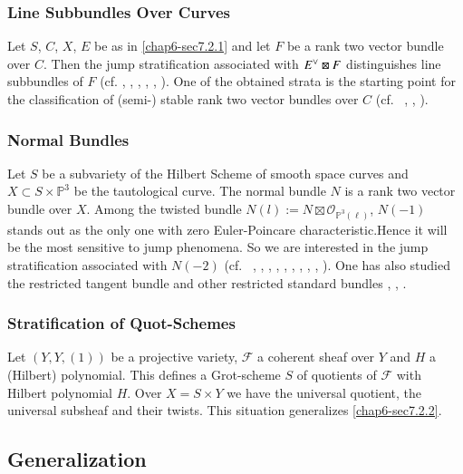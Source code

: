 \subsubsection{Line Subbundles Over Curves}\label{chap6-sec7.2.4}

Let $S$, $C$, $X$, $E$ be as in \ref{chap6-sec7.2.1} and let $F$ be a
rank two vector bundle over $C$. Then the jump stratification
associated with $E\spcheck \boxtimes F$ distinguishes line subbundles
of $F$
(cf. \cite{chap6-N}, \cite{chap6-Ma1}, \cite{chap6-St}, \cite{chap6-Gu},
\cite{chap6-LN}, \cite{chap6-Ray}). One of the obtained strata is the
starting point for the classification of (semi-) stable rank two
vector bundles over $C$
(cf.~ \cite{chap6-NR1}, \cite{chap6-NR2}, \cite{chap6-NR3}). 

\subsubsection{Normal Bundles}\label{chap6-sec7.2.5}

Let $S$ be a subvariety of the Hilbert Scheme of smooth space curves
and $X\subset S\times \mathbb{P}^{3}$ be the tautological curve. The
normal bundle $N$ is a rank two vector bundle over $X$. Among the
twisted bundle $N(l):=N\boxtimes \mathscr{O}_{\mathbb{P}^{3}(\ell)}$,
$N(-1)$ stands out as the only one with zero Euler-Poincare
characteristic.\pageoriginale Hence it will be the most sensitive to
jump phenomena. So we are interested in the jump stratification
associated with $N(-2)$
(cf.~ \cite{chap6-GS}, \cite{chap6-S1}, \cite{chap6-EV1}, \cite{chap6-EV2},
\cite{chap6-EL}, \cite{chap6-HuS}, \cite{chap6-El}, \cite{chap6-BE2}, \cite{chap6-E1H},
\cite{chap6-Hu2}). One has also studied the restricted tangent bundle
and other restricted standard
bundles \cite{chap6-V}, \cite{chap6-Br}, \cite{chap6-Ki}.

\subsubsection{Stratification of Quot-Schemes}\label{chap6-sec7.2.6}

Let $(Y,Y,(1))$ be a projective variety, $\mathscr{F}$ a coherent
sheaf over $Y$ and $H$ a (Hilbert) polynomial. This defines a
Grot-scheme $S$ of quotients of $\mathscr{F}$ with Hilbert polynomial
$H$. Over $X=S\times Y$ we have the universal quotient, the universal
subsheaf and their twists. This situation
generalizes \ref{chap6-sec7.2.2}. 

\subsection{Generalization}\label{chap6-sec7.3}

